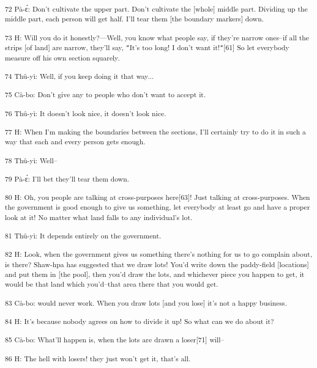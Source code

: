 {\textsuperscript{72 Pà-ɛ́: Don't cultivate the upper part. Don't cultivate
the [whole] middle part. Dividing up the middle part, each person will get half.
I'll tear them [the boundary markers] down.}}

{\textsuperscript{73 H: Will you do it honestly?---Well, you know what people
say, if they're narrow ones--if all the strips [of land] are narrow, they'll say,
\texttt{"}It's too long! I don't want it!\texttt{"}[61] So let everybody measure
off his own section squarely. }}

{\textsuperscript{74 Thû-yì: Well, if you keep doing it that way...}}

{\textsuperscript{75 Cà-bo: Don't give any to people who don't want to
accept it.}}

{\textsuperscript{76 Thû-yì: It doesn't look nice, it doesn't look nice.}}

{\textsuperscript{77 H: When I'm making the boundaries between the sections,
I'll certainly try to do it in such a way that each and every person gets enough.}}

{\textsuperscript{78 Thû-yì: Well--}}

{\textsuperscript{79 Pà-ɛ́: I'll bet they'll tear them down.}}

{\textsuperscript{80 H: Oh, you people are talking at cross-purposes here[63]!
Just talking at cross-purposes. When the government is good enough to give us something,
let everybody at least go and have a proper look at it! No matter what land falls
to any individual's lot.}}

{\textsuperscript{81 Thû-yì: It depends entirely on the government.}}

{\textsuperscript{82 H: Look, when the government gives us something there's
nothing for us to go complain about, is there? Shaw-hpa has suggested that we draw
lots! You'd write down the paddy-field [locations] and put them in [the pool],
then you'd draw the lots, and whichever piece you happen to get, it would be that
land which you'd--that area there that you would get. }}

{\textsuperscript{83 Cà-bo: would never work. When you draw lots [and you
lose] it's not a happy business. }}

{\textsuperscript{84 H: It's because nobody agrees on how to divide it up!
So what can we do about it? }}

{\textsuperscript{85 Cà-bo: What'll happen is, when the lots are drawn
a loser[71] will--}}

{\textsuperscript{86 H: The hell with losers! they just won't get it, that's
all. }}

